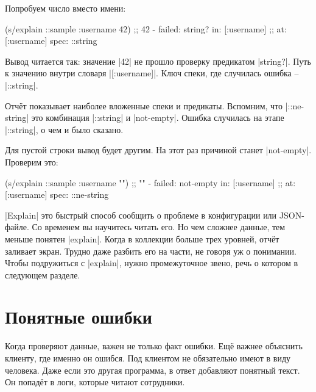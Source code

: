 \noindent
Попробуем число вместо имени:

\begin{english}
  \begin{clojure}
(s/explain ::sample {:username 42})
;; 42 - failed: string? in: [:username]
;; at: [:username] spec: ::string
  \end{clojure}
\end{english}

Вывод читается так: значение \spverb|42| не прошло проверку предикатом
\spverb|string?|. Путь к значению внутри словаря \spverb|[:username]|. Ключ
спеки, где случилась ошибка -- \spverb|::string|.

Отч\"{е}т показывает наиболее вложенные спеки и предикаты. Вспомним, что
\spverb|::ne-string| это комбинация \spverb|::string| и
\spverb|not-empty|. Ошибка случилась на этапе \spverb|::string|, о чем и было
сказано.

Для пустой строки вывод будет другим. На этот раз причиной станет
\spverb|not-empty|. Проверим это:

\begin{english}
  \begin{clojure}
(s/explain ::sample {:username ""})
;; "" - failed: not-empty in: [:username]
;; at: [:username] spec: ::ne-string
  \end{clojure}
\end{english}

\spverb|Explain| это быстрый способ сообщить о проблеме в конфигурации или
JSON-файле. Со временем вы научитесь читать его. Но чем сложнее данные, тем
меньше понятен \spverb|explain|. Когда в коллекции больше трех уровней, отч\"{е}т
заливает экран. Трудно даже разбить его на части, не говоря уж о
понимании. Чтобы подружиться с \spverb|explain|, нужно промежуточное звено, речь
о котором в следующем разделе.

\section{Понятные ошибки}


\label{spec-messages}

Когда проверяют данные, важен не только факт ошибки. Ещ\"{е} важнее объяснить
клиенту, где именно он ошибся. Под клиентом не обязательно имеют в виду
человека. Даже если это другая программа, в ответ добавляют понятный текст. Он
попад\"{е}т в логи, которые читают сотрудники.

